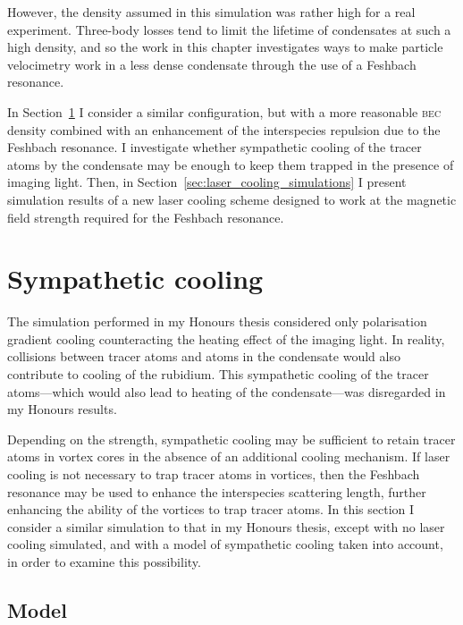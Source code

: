 However, the density assumed in this simulation was rather high for a real experiment. Three-body losses tend to limit the lifetime of condensates at such a high density, and so the work in this chapter investigates ways to make particle velocimetry work in a less dense condensate through the use of a Feshbach resonance.

In Section~\ref{sec:sympathetic} I consider a similar configuration, but with a more reasonable \textsc{bec} density combined with an enhancement of the interspecies repulsion due to the Feshbach resonance. I investigate whether sympathetic cooling of the tracer atoms by the condensate may be enough to keep them trapped in the presence of imaging light. Then, in Section~\ref{sec:laser_cooling_simulations} I present simulation results of a new laser cooling scheme designed to work at the magnetic field strength required for the Feshbach resonance.

\section{Sympathetic cooling}\label{sec:sympathetic}

The simulation performed in my Honours thesis considered only polarisation gradient cooling counteracting the heating effect of the imaging light. In reality, collisions between tracer atoms and atoms in the condensate would also contribute to cooling of the rubidium. This sympathetic cooling of the tracer atoms---which would also lead to heating of the condensate---was disregarded in my Honours results. 

Depending on the strength, sympathetic cooling may be sufficient to retain tracer atoms in vortex cores in the absence of an additional cooling mechanism. If laser cooling is not necessary to trap tracer atoms in vortices, then the Feshbach resonance may be used to enhance the interspecies scattering length, further enhancing the ability of the vortices to trap tracer atoms. In this section I consider a similar simulation to that in my Honours thesis, except with no laser cooling simulated, and with a model of sympathetic cooling taken into account, in order to examine this possibility.

\subsection{Model}

